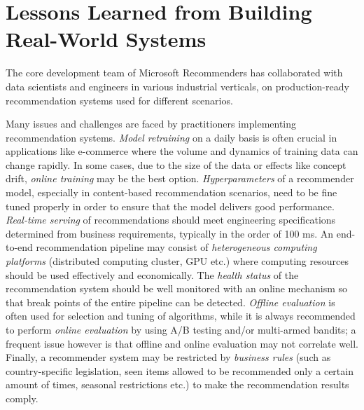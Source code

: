 \section{Lessons Learned from Building Real-World Systems} 

The core development team of Microsoft Recommenders has collaborated with data scientists and engineers 
in various industrial verticals, on production-ready recommendation systems used for different scenarios. 

Many issues and challenges are faced by practitioners implementing recommendation systems. 
{\em Model retraining} on a daily basis is often crucial in applications like e-commerce where the volume and dynamics of training data can change rapidly. 
In some cases, due to the size of the data or effects like concept drift, {\em online training} may be the best option. 
{\em Hyperparameters} of a recommender model, especially in content-based recommendation scenarios, need to be fine tuned properly in order to ensure that the model delivers good performance.
{\em Real-time serving} of recommendations should meet engineering specifications determined from business requirements, 
typically in the order of 100 ms. An end-to-end recommendation pipeline may consist of {\em heterogeneous computing platforms} 
(distributed computing cluster, GPU etc.) where computing resources should be used effectively and economically. 
The {\em health status} of the recommendation system should be well monitored with an online mechanism 
so that break points of the entire pipeline can be detected. 
{\em Offline evaluation} is often used for selection and tuning of algorithms, while it is always recommended to perform {\em online evaluation} 
by using A/B testing and/or multi-armed bandits; a frequent issue however is that offline and online evaluation may not correlate well. 
Finally, a recommender system may be restricted by {\em business rules} (such as country-specific legislation, 
seen items allowed to be recommended only a certain amount of times, seasonal restrictions etc.) 
to make the recommendation results comply.


